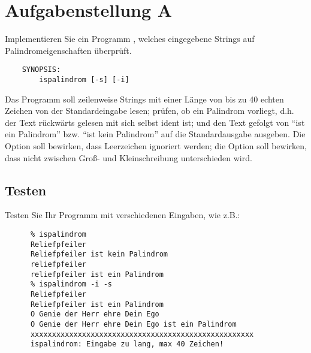 




\section*{Aufgabenstellung A}

Implementieren Sie ein Programm , welches
eingegebene Strings auf Palindromeigenschaften überprüft.

\begin{verbatim}
    SYNOPSIS:
        ispalindrom [-s] [-i]
\end{verbatim}

Das Programm  soll zeilenweise Strings mit einer
Länge von bis zu 40 echten Zeichen von der Standardeingabe lesen;
prüfen, ob ein Palindrom vorliegt, d.h. der Text rückwärts gelesen
mit sich selbst ident ist; und den Text gefolgt von "`ist ein
Palindrom"' bzw. "`ist kein Palindrom"' auf die Standardausgabe
ausgeben. Die Option  soll bewirken, dass Leerzeichen
ignoriert werden; die Option  soll bewirken, dass nicht
zwischen Groß- und Kleinschreibung unterschieden wird.

\subsection*{Testen}

Testen Sie Ihr Programm mit verschiedenen Eingaben, wie z.B.:

\begin{verbatim}
      % ispalindrom
      Reliefpfeiler
      Reliefpfeiler ist kein Palindrom
      reliefpfeiler
      reliefpfeiler ist ein Palindrom
      % ispalindrom -i -s
      Reliefpfeiler
      Reliefpfeiler ist ein Palindrom
      O Genie der Herr ehre Dein Ego
      O Genie der Herr ehre Dein Ego ist ein Palindrom
      xxxxxxxxxxxxxxxxxxxxxxxxxxxxxxxxxxxxxxxxxxxxxxxxxxxx
      ispalindrom: Eingabe zu lang, max 40 Zeichen!
\end{verbatim}

\osueguidelinesone


